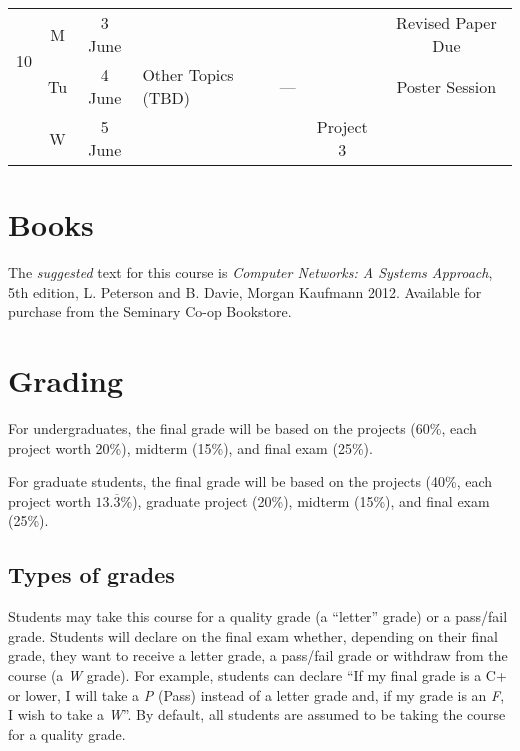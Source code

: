 \documentclass[11pt]{article}
\begin{document}
\begin{sidewaystable}
\begin{tabular}{|c|cc||p{8cm}|c|c|c|}
\multirow{2}{*}{10} & M & 3 June    & \cellcolor[gray]{0.9} & \cellcolor[gray]{0.9} &  \cellcolor[gray]{0.9} & Revised Paper Due \\\cline{2-7}
                    & Tu & 4 June   & Other Topics (TBD)                & ---  & \cellcolor[gray]{0.9}  & Poster Session \\\cline{2-7}
                    & W &  5 June  & \cellcolor[gray]{0.9} & \cellcolor[gray]{0.9} &  Project 3 & \cellcolor[gray]{0.9} \\\hline
\end{tabular}
\label{tab:calendar}
\end{sidewaystable}


\section{Books}

The \emph{suggested} text for this course is \emph{Computer Networks: A Systems Approach}, 5th edition, L. Peterson and B. Davie, Morgan Kaufmann 2012. Available for purchase from the Seminary Co-op Bookstore. 

  
\section{Grading}

For undergraduates, the final grade will be based on the projects (60\%, each project worth 20\%), midterm (15\%), and final exam (25\%).

For graduate students, the final grade will be based on the projects (40\%, each project worth $13.\overline{3}$\%), graduate project (20\%), midterm (15\%), and final exam (25\%).

\subsection{Types of grades}

Students may take this course for a quality grade (a ``letter'' grade) or a pass/fail grade. Students will declare on the final exam whether, depending on their final grade, they want to receive a letter grade, a pass/fail grade or withdraw from the course (a \emph{W} grade). For example, students can declare ``If my final grade is a C+ or lower, I will take a \emph{P} (Pass) instead of a letter grade and, if my grade is an \emph{F}, I wish to take a \emph{W}''. By default, all students are assumed to be taking the course for a quality grade.
\end{document}
